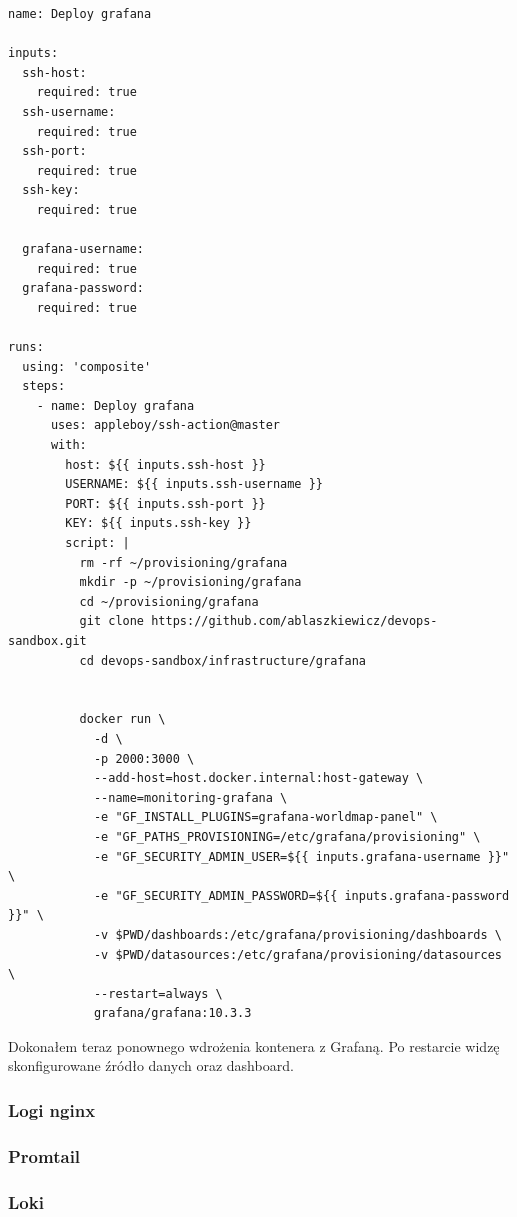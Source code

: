 \documentclass{article}
\begin{document}
\begin{lstlisting}[caption=Zmodyfikowany plik \texttt{.github/templates/deploy-grafana/action.yml}]
name: Deploy grafana

inputs:
  ssh-host:
    required: true
  ssh-username:
    required: true
  ssh-port:
    required: true
  ssh-key:
    required: true

  grafana-username:
    required: true
  grafana-password:
    required: true

runs:
  using: 'composite'
  steps:
    - name: Deploy grafana
      uses: appleboy/ssh-action@master
      with:
        host: ${{ inputs.ssh-host }}
        USERNAME: ${{ inputs.ssh-username }}
        PORT: ${{ inputs.ssh-port }}
        KEY: ${{ inputs.ssh-key }}
        script: |
          rm -rf ~/provisioning/grafana
          mkdir -p ~/provisioning/grafana
          cd ~/provisioning/grafana
          git clone https://github.com/ablaszkiewicz/devops-sandbox.git
          cd devops-sandbox/infrastructure/grafana


          docker run \
            -d \
            -p 2000:3000 \
            --add-host=host.docker.internal:host-gateway \
            --name=monitoring-grafana \
            -e "GF_INSTALL_PLUGINS=grafana-worldmap-panel" \
            -e "GF_PATHS_PROVISIONING=/etc/grafana/provisioning" \
            -e "GF_SECURITY_ADMIN_USER=${{ inputs.grafana-username }}" \
            -e "GF_SECURITY_ADMIN_PASSWORD=${{ inputs.grafana-password }}" \
            -v $PWD/dashboards:/etc/grafana/provisioning/dashboards \
            -v $PWD/datasources:/etc/grafana/provisioning/datasources \
            --restart=always \
            grafana/grafana:10.3.3
\end{lstlisting}

Dokonałem teraz ponownego wdrożenia kontenera z Grafaną. Po restarcie widzę skonfigurowane źródło danych oraz dashboard.

\subsubsection{Logi nginx}

\subsubsection{Promtail}

\subsubsection{Loki}
\end{document}
